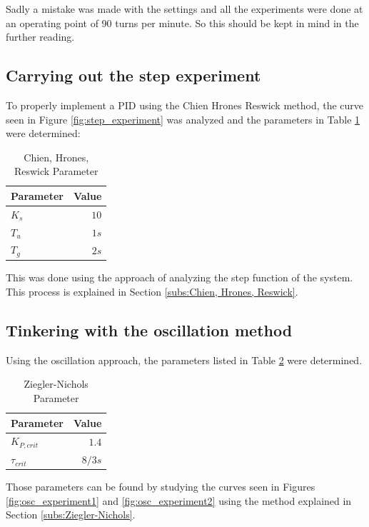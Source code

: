 Sadly a mistake was made  with the settings and all the experiments were done at an operating point of 90 turns per minute. So this should be kept in mind in the further reading.

\subsection{Carrying out the step experiment}

To properly implement a PID using the Chien Hrones Reswick method, the curve seen in Figure \ref{fig:step_experiment} was analyzed and the parameters in Table \ref{tab:step_params} were determined:

\begin{table}[H]
\begin{center}
\begin{tabular}{ l | r}
  Parameter & Value\\
  \hline
  \hline
  $K_s$ & $10$\\
  \hline
  $T_u$ & $1s$\\
  \hline
  $T_g$ & $2s$\\
  \hline
\end{tabular}
\end{center}
\caption{Chien, Hrones, Reswick Parameter}
\label{tab:step_params}
\end{table}

This was done using the approach of analyzing the step function of the system. This process is explained in Section \ref{subs:Chien, Hrones, Reswick}.

\subsection{Tinkering with the oscillation method}

Using the oscillation approach, the parameters listed in Table \ref{tab:osc_params} were determined.

\begin{table}[H]
\begin{center}
\begin{tabular}{ l | r}
  Parameter & Value\\
  \hline
  \hline
  $K_{P,crit}$ & $1.4$\\
  \hline
  $\tau_{crit}$ & $8/3s$\\
  \hline
\end{tabular}
\end{center}
\caption{Ziegler-Nichols Parameter}
\label{tab:osc_params}
\end{table}

Those parameters can be found by studying the curves seen in Figures \ref{fig:osc_experiment1} and \ref{fig:osc_experiment2} using the method explained in Section \ref{subs:Ziegler-Nichols}.